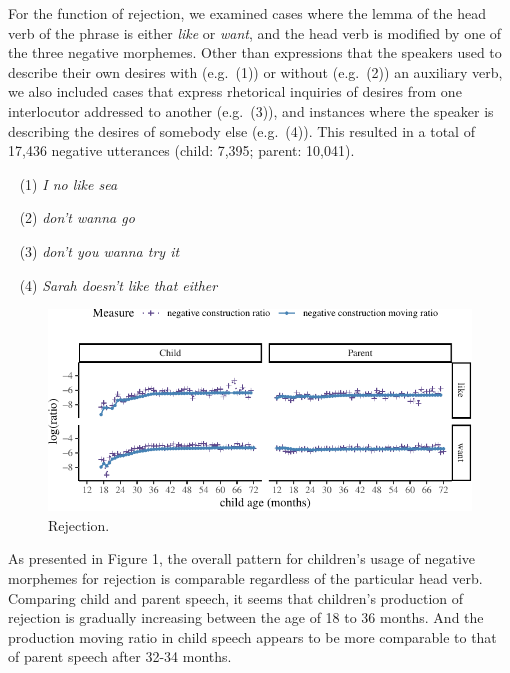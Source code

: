 \documentclass[10pt, letterpaper]{article}
\newenvironment{CodeChunk}{}{}
\begin{document}
For the function of rejection, we examined cases where the lemma of the
head verb of the phrase is either \emph{like} or \emph{want}, and the
head verb is modified by one of the three negative morphemes. Other than
expressions that the speakers used to describe their own desires with
(e.g.~(1)) or without (e.g.~(2)) an auxiliary verb, we also included
cases that express rhetorical inquiries of desires from one interlocutor
addressed to another (e.g.~(3)), and instances where the speaker is
describing the desires of somebody else (e.g.~(4)). This resulted in a
total of 17,436 negative utterances (child: 7,395; parent: 10,041).

~ (1) \emph{I no like sea}

~ (2) \emph{don't wanna go}

~ (3) \emph{don't you wanna try it}

~ (4) \emph{Sarah doesn't like that either}

\begin{figure}[h]

\begin{CodeChunk}


\begin{center}\includegraphics{figs/emotion-1} \end{center}

\end{CodeChunk}
\caption[This image spans both columns]{Rejection.}\label{fig:rejection}
\end{figure}

As presented in Figure 1, the overall pattern for children's usage of
negative morphemes for rejection is comparable regardless of the
particular head verb. Comparing child and parent speech, it seems that
children's production of rejection is gradually increasing between the
age of 18 to 36 months. And the production moving ratio in child speech
appears to be more comparable to that of parent speech after 32-34
months.
\end{document}
